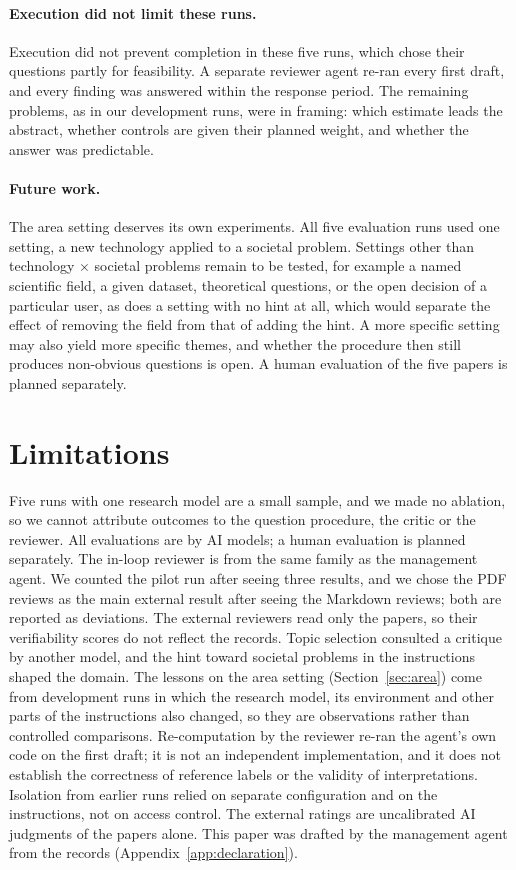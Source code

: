 \documentclass[11pt]{article}
\begin{document}
\paragraph{Execution did not limit these runs.} Execution did not prevent completion in these five runs, which chose their questions partly for feasibility. A separate reviewer agent re-ran every first draft, and every finding was answered within the response period. The remaining problems, as in our development runs, were in framing: which estimate leads the abstract, whether controls are given their planned weight, and whether the answer was predictable.

\paragraph{Future work.} The area setting deserves its own experiments. All five evaluation runs used one setting, a new technology applied to a societal problem. Settings other than technology $\times$ societal problems remain to be tested, for example a named scientific field, a given dataset, theoretical questions, or the open decision of a particular user, as does a setting with no hint at all, which would separate the effect of removing the field from that of adding the hint. A more specific setting may also yield more specific themes, and whether the procedure then still produces non-obvious questions is open. A human evaluation of the five papers is planned separately.

\section{Limitations}
\label{sec:limitations}
Five runs with one research model are a small sample, and we made no ablation, so we cannot attribute outcomes to the question procedure, the critic or the reviewer. All evaluations are by AI models; a human evaluation is planned separately. The in-loop reviewer is from the same family as the management agent. We counted the pilot run after seeing three results, and we chose the PDF reviews as the main external result after seeing the Markdown reviews; both are reported as deviations. The external reviewers read only the papers, so their verifiability scores do not reflect the records. Topic selection consulted a critique by another model, and the hint toward societal problems in the instructions shaped the domain. The lessons on the area setting (Section~\ref{sec:area}) come from development runs in which the research model, its environment and other parts of the instructions also changed, so they are observations rather than controlled comparisons. Re-computation by the reviewer re-ran the agent's own code on the first draft; it is not an independent implementation, and it does not establish the correctness of reference labels or the validity of interpretations. Isolation from earlier runs relied on separate configuration and on the instructions, not on access control. The external ratings are uncalibrated AI judgments of the papers alone. This paper was drafted by the management agent from the records (Appendix~\ref{app:declaration}).
\end{document}
